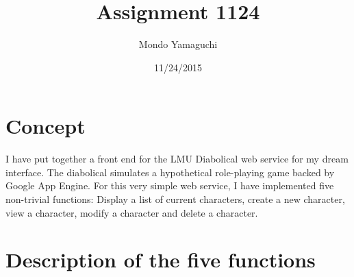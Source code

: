 \documentclass[100pt]{article}
\title{\Large{Assignment 1124}}
\author{\Large{Mondo Yamaguchi}}
\date{\Large{11/24/2015}}
\begin{document}
\maketitle


\section{\Large{Concept}}
\large{
I have put together a front end for the LMU Diabolical web service for my dream interface. The diabolical simulates a hypothetical role-playing game backed by Google App Engine. For this very simple web service, I have implemented five non-trivial functions: Display a list of current characters, create a new character, view a character, modify a character and delete a character. 
}

\section{\Large{Description of the five functions}}
\end{document}
